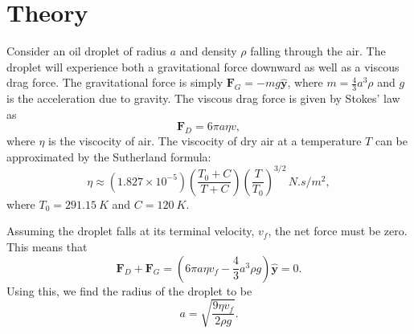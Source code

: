 \documentclass[aps, reprint,amsmath,amssymb]{revtex4-1} %
\renewcommand{\vec}[1]{\mathbf{#1}}
\newcommand{\y}{\vec{\hat{y}}}
\begin{document}
\section{Theory}



Consider an oil droplet of radius $a$ and density $\rho$ falling through
the air. The droplet will experience both a gravitational force downward as
well as a viscous drag force. The gravitational force is simply $\vec{F}_G =
-mg\y$, where $m = \frac{4}{3}a^3 \rho$ and $g$ is the acceleration due to
gravity. The viscous drag force is given by Stokes' law as
\begin{equation}
    \vec{F}_D = 6\pi a \eta v,
\end{equation}
where $\eta$ is the viscocity of air. The viscocity of dry air at a
temperature $T$ can be approximated by the Sutherland formula:
\begin{equation}
    \eta \approx (1.827\times 10^{-5}) \left( \frac{T_0 + C}{T + C} \right)
    \left( \frac{T}{T_0} \right)^{3/2}\, \si{N.s/m^2},
\end{equation}
where $T_0 = \SI{291.15}{K}$ and $C = \SI{120}{K}$. 

Assuming the droplet falls at its terminal velocity, $v_f$, the net force must be
zero. This means that
\begin{equation}\label{eq:noE_balance}
    \vec{F}_D + \vec{F}_G = \left(6\pi a \eta v_f - \frac{4}{3} a^3 \rho g\right)\y = 0.
\end{equation}
Using this, we find the radius of the droplet to be
\begin{equation}\label{eq:radius}
    a = \sqrt{\frac{9\eta v_f}{2\rho g}}.
\end{equation}
\end{document}
